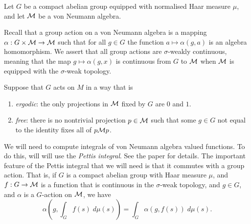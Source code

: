 Let $G$ be a compact abelian group equipped with normalised Haar
measure $\mu$, and let $\mathcal{M}$ be a von Neumann algebra.

Recall that a group action on a von Neumann algebra
is a mapping $\alpha:G\times \mathcal{M}\rightarrow \mathcal{M}$ such that
for all $g \in G$ the function $a\mapsto \alpha(g,a)$ is an algebra
homomorphism. We assert that all group actions
are $\sigma$-weakly continuous, meaning that the map $g\mapsto \alpha(g,x)$
is continuous from $G$ to $\mathcal{M}$ when $\mathcal{M}$ is equipped with the $\sigma$-weak
topology.

Suppose that $G$ acts on $M$ in a way that is
\begin{enumerate}
    \item{} \emph{ergodic}: the only projections in $\mathcal{M}$
    fixed by $G$ are $0$ and $1$.
    \item{} \emph{free}: there is no nontrivial projection $p \in \mathcal{M}$
    such that some $g \in G$ not equal to the identity fixes all of $p\mathcal{M} p$.
\end{enumerate}

We will need to compute integrals of von Neumann algebra valued functions.
To do this, will will use the \emph{Pettis integral}. See the paper
\cite{zsido1977spectral} for details. The important feature of the Pettis
integral that we will need is that it commutes with a group action.
That is, if $G$ is a compact abelian group with Haar measure $\mu$, and 
$f:G\to \mathcal{M}$ is a function that is continuous in the $\sigma$-weak topology, 
and $g \in G$, and $\alpha$ is a $G$-action on $\mathcal{M}$, we have
\begin{equation}
    \alpha(g,\int_G f(s)\;d\mu(s)) = \int_G \alpha(g,f(s))\;d\mu(s).
\end{equation}


